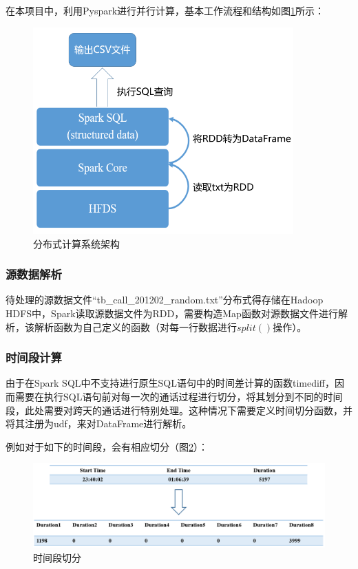 \documentclass[12pt,a4paper]{article}
\begin{document}
在本项目中，利用Pyspark进行并行计算，基本工作流程和结构如图\ref{computing_architecture}所示：

\begin{figure}[htb]
\centering
\includegraphics[width=10cm]{computing_architecture}
\caption{分布式计算系统架构 \label{computing_architecture}}
\end{figure}
\subsubsection{源数据解析}
待处理的源数据文件“tb\_call\_201202\_random.txt”分布式得存储在Hadoop HDFS中，Spark读取源数据文件为RDD，需要构造Map函数对源数据文件进行解析，该解析函数为自己定义的函数（对每一行数据进行$split()$操作）。
\subsubsection{时间段计算}
由于在Spark SQL中不支持进行原生SQL语句中的时间差计算的函数timediff，因而需要在执行SQL语句前对每一次的通话过程进行切分，将其划分到不同的时间段，此处需要对跨天的通话进行特别处理。这种情况下需要定义时间切分函数，并将其注册为udf，来对DataFrame进行解析。

例如对于如下的时间段，会有相应切分（图\ref{time_period}）：
\begin{figure}[htb]
\centering
\includegraphics[width=14cm]{time_period}
\caption{时间段切分 \label{time_period}}
\end{figure}
\end{document}
